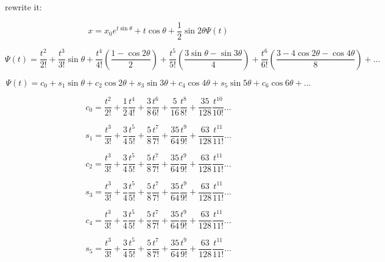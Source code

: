 \documentclass{article}
\begin{document}
rewrite it:

\begin{equation}
   x =  x_0 e^{t \sin \theta} + t \cos \theta + \frac{1}{2} \sin 2\theta \Psi(t)
\end{equation}

\begin{equation}
   \Psi(t) =  \frac{t^2}{2!} + \frac{t^3}{3!} \sin \theta + \frac{t^4}{4!} (\frac{1 - \cos 2\theta}{2}) + \frac{t^5}{5!} (\frac{3 \sin \theta - \sin 3\theta}{4}) + \frac{t^6}{6!} (\frac{3 - 4 \cos 2\theta - \cos 4\theta}{8}) + ...
\end{equation}

\begin{equation}
   \Psi(t) = c_0 + s_1 \sin \theta + c_2 \cos 2\theta + s_3 \sin 3\theta + c_4 \cos 4\theta + s_5 \sin 5\theta + c_6 \cos 6\theta + ...
\end{equation}

\begin{equation}
   c_0 = \frac{t^2}{2!} + \frac{1}{2}\frac{t^4}{4!} + \frac{3}{8} \frac{t^6}{6!} + \frac{5}{16} \frac{t^8}{8!} + \frac{35}{128} \frac{t^{10}}{10!}  ...
\end{equation}

\begin{equation}
   s_1 = \frac{t^3}{3!} + \frac{3}{4}\frac{t^5}{5!} + \frac{5}{8} \frac{t^7}{7!} + \frac{35}{64} \frac{t^9}{9!} + \frac{63}{128} \frac{t^{11}}{11!}  ...
\end{equation}

\begin{equation}
   c_2 = \frac{t^3}{3!} + \frac{3}{4}\frac{t^5}{5!} + \frac{5}{8} \frac{t^7}{7!} + \frac{35}{64} \frac{t^9}{9!} + \frac{63}{128} \frac{t^{11}}{11!}  ...
\end{equation}

\begin{equation}
   s_3 = \frac{t^3}{3!} + \frac{3}{4}\frac{t^5}{5!} + \frac{5}{8} \frac{t^7}{7!} + \frac{35}{64} \frac{t^9}{9!} + \frac{63}{128} \frac{t^{11}}{11!}  ...
\end{equation}

\begin{equation}
   c_4 = \frac{t^3}{3!} + \frac{3}{4}\frac{t^5}{5!} + \frac{5}{8} \frac{t^7}{7!} + \frac{35}{64} \frac{t^9}{9!} + \frac{63}{128} \frac{t^{11}}{11!}  ...
\end{equation}

\begin{equation}
   s_5 = \frac{t^3}{3!} + \frac{3}{4}\frac{t^5}{5!} + \frac{5}{8} \frac{t^7}{7!} + \frac{35}{64} \frac{t^9}{9!} + \frac{63}{128} \frac{t^{11}}{11!}  ...
\end{equation}
\end{document}
